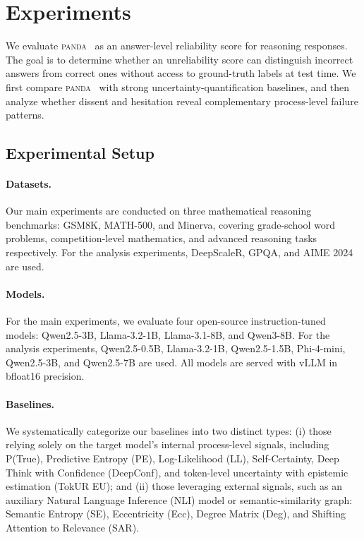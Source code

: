 \documentclass{article} %
\DeclareRobustCommand{\method}{%
  \texorpdfstring{%
    \ifmmode\text{\normalfont\textsc{panda}}\else\textsc{panda}\xspace\fi
  }{PANDA}%
}
\begin{document}
\section{Experiments}

We evaluate \method\ as an answer-level reliability score for reasoning
responses.
The goal is to determine whether an unreliability score can distinguish
incorrect answers from correct ones without access to ground-truth labels at
test time.
We first compare \method\ with strong uncertainty-quantification baselines, and
then analyze whether dissent and hesitation reveal complementary process-level
failure patterns.

\subsection{Experimental Setup}
\label{sec:experimental-setup}

\paragraph{Datasets.}
Our main experiments are conducted on three mathematical reasoning benchmarks: GSM8K, MATH-500, and Minerva, covering grade-school word problems, competition-level mathematics, and advanced reasoning tasks respectively. For the analysis experiments, DeepScaleR, GPQA, and AIME 2024 are used.

\paragraph{Models.}
For the main experiments, we evaluate four open-source instruction-tuned models: Qwen2.5-3B, Llama-3.2-1B, Llama-3.1-8B, and Qwen3-8B. For the analysis experiments, Qwen2.5-0.5B, Llama-3.2-1B, Qwen2.5-1.5B, Phi-4-mini, Qwen2.5-3B, and Qwen2.5-7B are used. All models are served with vLLM in bfloat16 precision.

\paragraph{Baselines.}
We systematically categorize our baselines into two distinct types:
(i) those relying solely on the target model's internal process-level signals, including P(True), Predictive Entropy (PE), Log-Likelihood (LL), Self-Certainty, Deep Think with Confidence (DeepConf), and token-level uncertainty with epistemic estimation (TokUR EU); and
(ii) those leveraging external signals, such as an auxiliary Natural Language Inference (NLI) model or semantic-similarity graph: Semantic Entropy (SE), Eccentricity (Ecc), Degree Matrix (Deg), and Shifting Attention to Relevance (SAR).
\end{document}
